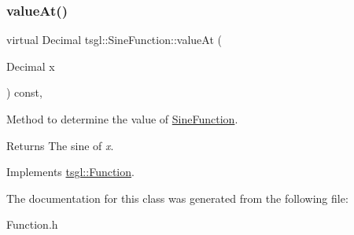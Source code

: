 \subsubsection{\texorpdfstring{value\+At()}{valueAt()}}
{\footnotesize\ttfamily virtual Decimal tsgl\+::\+Sine\+Function\+::value\+At (\begin{DoxyParamCaption}\item[{Decimal}]{x }\end{DoxyParamCaption}) const\hspace{0.3cm}{\ttfamily [inline]}, {\ttfamily [virtual]}}



Method to determine the value of \hyperlink{classtsgl_1_1_sine_function}{Sine\+Function}. 

\begin{DoxyReturn}{Returns}
The sine of {\itshape x}. 
\end{DoxyReturn}


Implements \hyperlink{classtsgl_1_1_function_affb7b3b19a04efefa29a9870d666e912}{tsgl\+::\+Function}.



The documentation for this class was generated from the following file\+:\begin{DoxyCompactItemize}
\item 
Function.\+h\end{DoxyCompactItemize}
